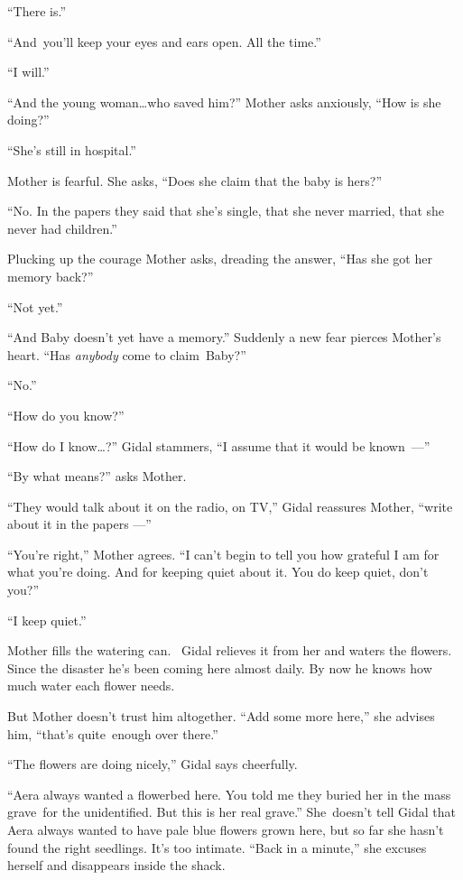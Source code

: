 \documentclass[twoside,11pt]{book}
\begin{document}
``There is.''

``And~you'll keep your eyes and ears open. All the time.''

``I will.''

``And the young woman{\ldots}who saved him?'' Mother asks anxiously, ``How is she
doing?''

``She's still in hospital.''

Mother is fearful.  She asks, ``Does she claim{ }that the baby is hers?''

``No. In the papers they said that she's single, that she never married, that she never had
children.''

Plucking up the courage Mother asks, dreading the answer,
``Has she got her memory back?''

``Not yet.''

``And Baby doesn't yet have a memory.'' Suddenly a new fear pierces Mother's heart.
``Has \textit{anybody }come to claim~Baby?''

``No.''

``How do you know?''

``How do I know{\ldots}?'' Gidal stammers, ``I assume that it would be
\hbox{known ---''}

``By what means?'' asks Mother.

``They would talk about it on the radio, on TV,'' Gidal reassures Mother, ``write
 about it in the papers ---''

``You're right,'' Mother agrees. ``I can't begin to tell you how grateful I am
for what you're doing. And for keeping quiet about it. You do keep quiet, don't you?''

``I keep quiet.''

Mother fills the watering can. ~Gidal relieves it from her and waters the flowers. Since the disaster he's been coming
here almost daily. By now he knows how much water each flower needs.

But Mother doesn't trust him altogether. ``Add some more here,'' she advises him,
``that's quite~enough over there.''

``The flowers are doing nicely,'' Gidal says cheerfully.

``Aera always wanted a flowerbed here. You told me they buried her in the mass grave~for the unidentified.
But this is her real grave.'' She~doesn't tell Gidal that Aera always wanted to have pale blue flowers
grown here, but so far she hasn't found the right seedlings. It's too intimate. ``Back in a
minute,'' she excuses herself and disappears inside the shack.
\end{document}
